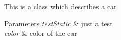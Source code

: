 This is a class which describes a car


\begin{DoxyParams}{Parameters}
{\em test\+Static} & just a test \\
\hline
{\em color} & color of the car \\
\hline
\end{DoxyParams}
